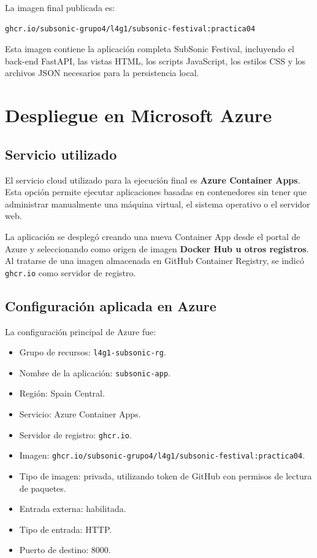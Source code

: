 \documentclass[11pt,a4paper]{article}
\begin{document}
La imagen final publicada es:

\begin{verbatim}
ghcr.io/subsonic-grupo4/l4g1/subsonic-festival:practica04
\end{verbatim}

Esta imagen contiene la aplicaci\'on completa SubSonic Festival, incluyendo el back-end FastAPI, las vistas HTML, los scripts JavaScript, los estilos CSS y los archivos JSON necesarios para la persistencia local.

\section{Despliegue en Microsoft Azure}

\subsection{Servicio utilizado}

El servicio cloud utilizado para la ejecuci\'on final es \textbf{Azure Container Apps}. Esta opci\'on permite ejecutar aplicaciones basadas en contenedores sin tener que administrar manualmente una m\'aquina virtual, el sistema operativo o el servidor web.

La aplicaci\'on se despleg\'o creando una nueva Container App desde el portal de Azure y seleccionando como origen de imagen \textbf{Docker Hub u otros registros}. Al tratarse de una imagen almacenada en GitHub Container Registry, se indic\'o \texttt{ghcr.io} como servidor de registro.

\subsection{Configuraci\'on aplicada en Azure}

La configuraci\'on principal de Azure fue:

\begin{itemize}
  \item Grupo de recursos: \texttt{l4g1-subsonic-rg}.
  \item Nombre de la aplicaci\'on: \texttt{subsonic-app}.
  \item Regi\'on: Spain Central.
  \item Servicio: Azure Container Apps.
  \item Servidor de registro: \texttt{ghcr.io}.
  \item Imagen: \texttt{ghcr.io/subsonic-grupo4/l4g1/subsonic-festival:practica04}.
  \item Tipo de imagen: privada, utilizando token de GitHub con permisos de lectura de paquetes.
  \item Entrada externa: habilitada.
  \item Tipo de entrada: HTTP.
  \item Puerto de destino: 8000.
\end{itemize}
\end{document}
